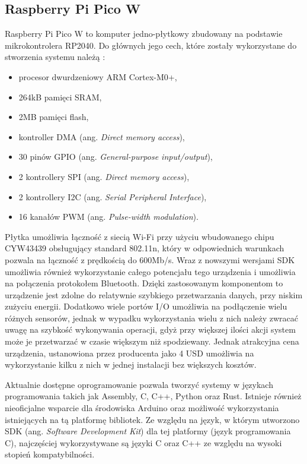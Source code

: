 \subsection*{Raspberry Pi Pico W}
Raspberry Pi Pico W\cite{picow} to komputer jedno-płytkowy zbudowany na podstawie mikrokontrolera RP2040. 
Do głównych jego cech, które zostały wykorzystane do stworzenia systemu należą \cite{rp2040:datasheet}:
\begin{itemize}
  \item procesor dwurdzeniowy ARM Cortex-M0+,
  \item 264kB pamięci SRAM,
  \item 2MB pamięci flash,
  \item kontroller DMA (ang. \textit{Direct memory access}),
  \item 30 pinów GPIO (ang. \textit{General-purpose input/output}),
  \item 2 kontrollery SPI (ang. \textit{Direct memory access}),
  \item 2 kontrollery I2C (ang. \textit{Serial Peripheral Interface}),
  \item 16 kanałów PWM (ang. \textit{Pulse-width modulation}).
\end{itemize}
Płytka umożliwia łączność z siecią Wi-Fi przy użyciu wbudowanego chipu CYW43439
obsługujący standard 802.11n, który w odpowiednich warunkach pozwala na łączność
z prędkością do 600Mb/s. Wraz z nowszymi wersjami SDK umożliwia również wykorzystanie
całego potencjału tego urządzenia i umożliwia na połączenia protokołem Bluetooth.
Dzięki zastosowanym komponentom to urządzenie jest zdolne do relatywnie szybkiego 
przetwarzania danych, przy niskim zużyciu energii. Dodatkowo wiele portów I/O umożliwia
na podłączenie wielu różnych sensorów, jednak w wypadku wykorzystania wielu z nich
należy zwracać uwagę na szybkość wykonywania operacji, gdyż przy większej ilości akcji
system może je przetwarzać w czasie większym niż spodziewany. Jednak atrakcyjna cena urządzenia,
ustanowiona przez producenta jako 4 USD umożliwia na wykorzystanie kilku z nich w jednej instalacji
bez większych kosztów.

Aktualnie dostępne oprogramowanie pozwala tworzyć systemy w językach programowania takich jak
Assembly, C, C++, Python oraz Rust. Istnieje również nieoficjalne wsparcie dla środowiska
Arduino oraz możliwość wykorzystania istniejących na tą platformę bibliotek.
Ze względu na język, w którym utworzono SDK (ang. \textit{Software Development Kit}) dla
tej platformy (język programowania C), najczęściej wykorzystywane są języki C oraz C++
ze względu na wysoki stopień kompatybilności.

